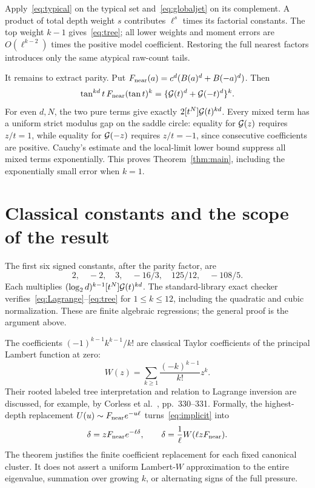 \documentclass[11pt,a4paper]{article}
\theoremstyle{remark}\newtheorem*{ednote}{Editorial note (ProveIt, 2026-10-01)}
\begin{document}
Apply~\eqref{eq:typical} on the typical set and~\eqref{eq:globaljet} on its complement. A product of total depth weight $s$ contributes $\ell^s$ times its factorial constants. The top weight $k-1$ gives~\eqref{eq:tree}; all lower weights and moment errors are $O(\ell^{k-2})$ times the positive model coefficient. Restoring the full nearest factors introduces only the same atypical raw-count tails.

It remains to extract parity. Put
$F_{\rm near}(a)=c^d(B(a)^d+B(-a)^d)$. Then
\[
 \tan^{kd}t\,F_{\rm near}(\tan t)^k
 =\{\mathcal G(t)^d+\mathcal G(-t)^d\}^k.
\]
For even $d,N$, the two pure terms give exactly $2[t^N]\mathcal G(t)^{kd}$. Every mixed term has a uniform strict modulus gap on the saddle circle: equality for $\mathcal G(z)$ requires $z/t=1$, while equality for $\mathcal G(-z)$ requires $z/t=-1$, since consecutive coefficients are positive. Cauchy's estimate and the local-limit lower bound suppress all mixed terms exponentially. This proves Theorem~\ref{thm:main}, including the exponentially small error when $k=1$.

\section{Classical constants and the scope of the result}
The first six signed constants, after the parity factor, are
\[
 2,\quad-2,\quad3,\quad-16/3,\quad125/12,\quad-108/5.
\]
Each multiplies $(\log_2d)^{k-1}[t^N]\mathcal G(t)^{kd}$.
The standard-library exact checker verifies~\eqref{eq:Lagrange}--\eqref{eq:tree} for $1\le k\le12$, including the quadratic and cubic normalization. These are finite algebraic regressions; the general proof is the argument above.

The coefficients $(-1)^{k-1}k^{k-1}/k!$ are classical Taylor coefficients of the principal Lambert function at zero:
\[
 W(z)=\sum_{k\ge1}\frac{(-k)^{k-1}}{k!}z^k.
\]
Their rooted labeled tree interpretation and relation to Lagrange inversion are discussed, for example, by Corless et al.~\cite{Lambert}, pp.~330--331. Formally, the highest-depth replacement $U(u)\sim F_{\rm near}e^{-u\ell}$ turns~\eqref{eq:implicit} into
\[
 \delta=zF_{\rm near}e^{-\ell\delta},\qquad
 \delta=\frac1\ell W(\ell zF_{\rm near}).
\]
The theorem justifies the finite coefficient replacement for each fixed canonical cluster. It does not assert a uniform Lambert-$W$ approximation to the entire eigenvalue, summation over growing $k$, or alternating signs of the full pressure.
\end{document}

